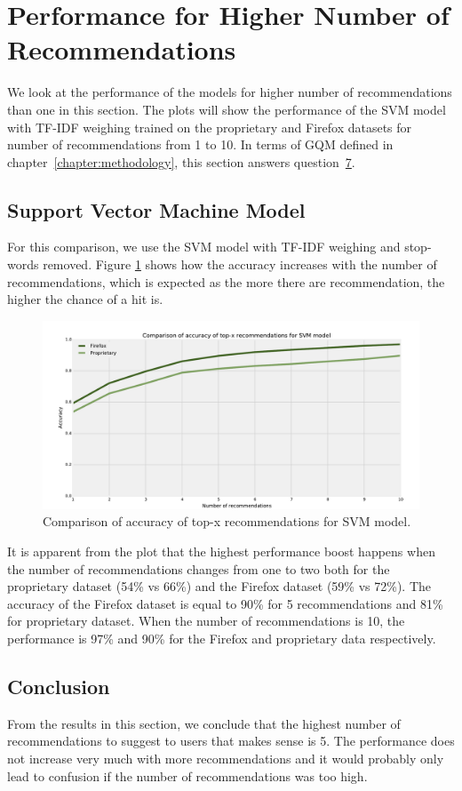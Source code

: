 \section{Performance for Higher Number of Recommendations}
\label{section:compare-number-of-recommendations}

We look at the performance of the models for higher number of recommendations than one in this section. The plots will show the performance of the SVM model with TF-IDF weighing trained on the proprietary and Firefox datasets for number of recommendations from 1 to 10. In terms of GQM defined in chapter~\ref{chapter:methodology}, this section answers question~\hyperlink{question:7}{7}.

\subsection{Support Vector Machine Model}

For this comparison, we use the SVM model with TF-IDF weighing and stop-words removed. Figure \ref{fig:results.topx.svm_accuracy} shows how the accuracy increases with the number of recommendations, which is expected as the more there are recommendation, the higher the chance of a hit is.

\begin{figure}[htbp]
    \centering
        \includegraphics[width=\textwidth]{./images/top_x_comparison/svm_accuracy.pdf}
    \caption{Comparison of accuracy of top-x recommendations for SVM model.}
    \label{fig:results.topx.svm_accuracy}
\end{figure}

It is apparent from the plot that the highest performance boost happens when the number of recommendations changes from one to two both for the proprietary dataset (54\% vs 66\%) and the Firefox dataset (59\% vs 72\%). The accuracy of the Firefox dataset is equal to 90\% for 5 recommendations and 81\% for proprietary dataset. When the number of recommendations is 10, the performance is 97\% and 90\% for the Firefox and proprietary data respectively.

\subsection{Conclusion}

From the results in this section, we conclude that the highest number of recommendations to suggest to users that makes sense is 5. The performance does not increase very much with more recommendations and it would probably only lead to confusion if the number of recommendations was too high.
